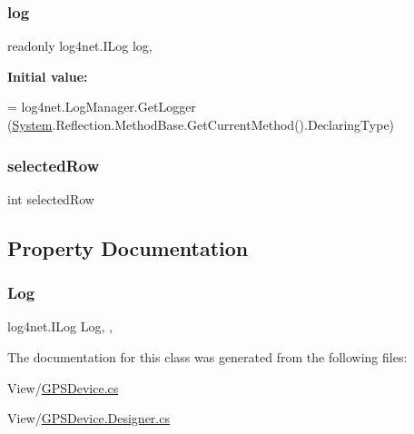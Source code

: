 \subsubsection{\texorpdfstring{log}{log}}
{\footnotesize\ttfamily readonly log4net.\+I\+Log log\hspace{0.3cm}{\ttfamily [static]}, {\ttfamily [private]}}

{\bfseries Initial value\+:}
\begin{DoxyCode}
= log4net.LogManager.GetLogger
        (\hyperlink{namespaceSystem}{System}.Reflection.MethodBase.GetCurrentMethod().DeclaringType)
\end{DoxyCode}
\mbox{\label{classWildlifeTrackingApp_1_1GPSDevice_aad96a74a8e07bceb571a64a3355b779d}} 
\subsubsection{\texorpdfstring{selected\+Row}{selectedRow}}
{\footnotesize\ttfamily int selected\+Row}



\subsection{Property Documentation}
\mbox{\label{classWildlifeTrackingApp_1_1GPSDevice_a5fc9abb86e6110ecd61d0a1a7d740a8a}} 
\subsubsection{\texorpdfstring{Log}{Log}}
{\footnotesize\ttfamily log4net.\+I\+Log Log\hspace{0.3cm}{\ttfamily [static]}, {\ttfamily [get]}, {}}



The documentation for this class was generated from the following files\+:\begin{DoxyCompactItemize}
\item 
View/\hyperlink{GPSDevice_8cs}{G\+P\+S\+Device.\+cs}\item 
View/\hyperlink{GPSDevice_8Designer_8cs}{G\+P\+S\+Device.\+Designer.\+cs}\end{DoxyCompactItemize}
